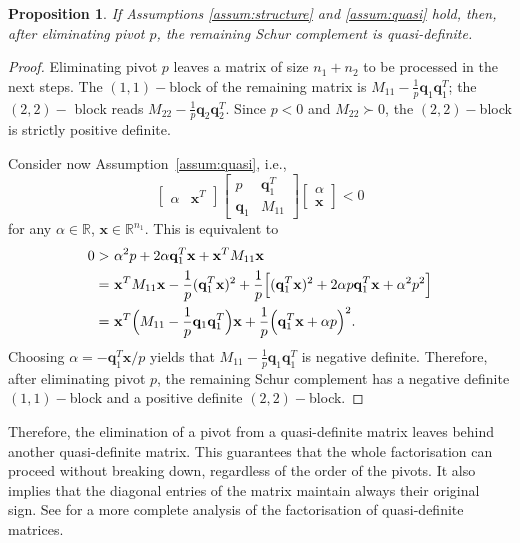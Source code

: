 \documentclass[a4paper]{article}
\newcommand{\qvec}{\mathbf q}
\newcommand{\xvec}{\mathbf x}
\newcommand{\0}{\mathbf 0}
\newtheorem{proposition}{Proposition}
\begin{document}
\begin{proposition}
If Assumptions \ref{assum:structure} and \ref{assum:quasi} hold, then, after eliminating pivot $p$, the remaining Schur complement is quasi-definite.
\end{proposition}
\begin{proof}
Eliminating pivot $p$ leaves a matrix of size $n_1+n_2$ to be processed in the next steps. The $(1,1)-$block of the remaining matrix is $M_{11}-\frac{1}{p}\qvec_1\qvec_1^T$; the $(2,2)-$ block reads $M_{22}-\frac{1}{p}\qvec_2\qvec_2^T$. Since $p<0$ and $M_{22}\succ0$, the $(2,2)-$block is strictly positive definite. 

Consider now Assumption~\ref{assum:quasi}, i.e.,
\[
\begin{bmatrix}
\alpha & \xvec^T
\end{bmatrix}
\begin{bmatrix}
p & \qvec_1^T \\ \qvec_1 & M_{11}
\end{bmatrix}
\begin{bmatrix}
\alpha \\ \xvec
\end{bmatrix}
<0
\]
for any $\alpha\in\mathbb R$, $\xvec\in\mathbb R^{n_1}$. This is equivalent to 
\begin{align}
0>\,\,& \alpha^2p+2\alpha \qvec_1^T\xvec +\xvec^TM_{11}\xvec \notag\\
=\,\,& \xvec^TM_{11}\xvec-\frac{1}{p}(\qvec_1^T\xvec)^2+\frac{1}{p}\Big[(\qvec_1^T\xvec)^2+2\alpha p \qvec_1^T\xvec+\alpha^2 p^2\Big] \notag\\
=\,\,& \xvec^T\Big(M_{11}-\frac{1}{p}\qvec_1\qvec_1^T\Big)\xvec+\frac{1}{p}\Big(\qvec_1^T\xvec+\alpha p\Big)^2 \notag.
\end{align}
Choosing $\alpha=-\qvec_1^T\xvec/p$ yields that $M_{11}-\frac{1}{p}\qvec_1\qvec_1^T$ is negative definite. Therefore, after eliminating pivot $p$, the remaining Schur complement has a negative definite $(1,1)-$block and a positive definite $(2,2)-$block.
\end{proof}

Therefore, the elimination of a pivot from a quasi-definite matrix leaves behind another quasi-definite matrix. This guarantees that the whole factorisation can proceed without breaking down, regardless of the order of the pivots. It also implies that the diagonal entries of the matrix maintain always their original sign. See \cite{Van:quasidefinite} for a more complete analysis of the factorisation of quasi-definite matrices.
\end{document}
